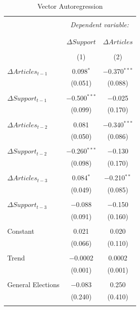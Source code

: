 \documentclass[12pt,]{article}
\begin{document}
\begin{table}[!htbp] \centering 
  \caption{Vector Autoregression} 
  \label{} 
\begin{tabular}{@{\extracolsep{5pt}}lcc} 
\\[-1.8ex]\hline 
\hline \\[-1.8ex] 
 & \multicolumn{2}{c}{\textit{Dependent variable:}} \\ 
\cline{2-3} 
\\[-1.8ex] & \multicolumn{2}{c}{} \\ 
 & $\Delta Support$ & $\Delta Articles$ \\ 
\\[-1.8ex] & (1) & (2)\\ 
\hline \\[-1.8ex] 
 $\Delta Articles_{t-1}$ & 0.098$^{*}$ & $-$0.370$^{***}$ \\ 
  & (0.051) & (0.088) \\ 
  & & \\ 
 $\Delta Support_{t-1}$ & $-$0.500$^{***}$ & $-$0.025 \\ 
  & (0.099) & (0.170) \\ 
  & & \\ 
 $\Delta Articles_{t-2}$ & 0.081 & $-$0.340$^{***}$ \\ 
  & (0.050) & (0.086) \\ 
  & & \\ 
 $\Delta Support_{t-2}$ & $-$0.260$^{***}$ & $-$0.130 \\ 
  & (0.098) & (0.170) \\ 
  & & \\ 
 $\Delta Articles_{t-3}$ & 0.084$^{*}$ & $-$0.210$^{**}$ \\ 
  & (0.049) & (0.085) \\ 
  & & \\ 
 $\Delta Support_{t-3}$ & $-$0.088 & $-$0.150 \\ 
  & (0.091) & (0.160) \\ 
  & & \\ 
 Constant & 0.021 & 0.020 \\ 
  & (0.066) & (0.110) \\ 
  & & \\ 
 Trend & $-$0.0002 & 0.0002 \\ 
  & (0.001) & (0.001) \\ 
  & & \\ 
 General Elections & $-$0.083 & 0.250 \\ 
  & (0.240) & (0.410) \\ 
  & & \\ 

\end{tabular}
\end{table}
\end{document}
